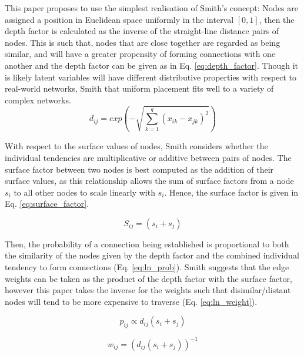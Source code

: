 \documentclass[
	a4paper, %
	10pt, %
	unnumberedsections, %
	twoside, %
]{LTJournalArticle}
\begin{document}
This paper proposes to use the simplest realisation of Smith's concept: Nodes are assigned a position in Euclidean space uniformly in the interval \([0, 1]\), then the depth factor is calculated as the inverse of the straight-line distance pairs of nodes. This is such that, nodes that are close together are regarded as being similar, and will have a greater propensity of forming connections with one another and the depth factor can be given as in Eq. \ref{eq:depth_factor}. Though it is likely latent variables will have different distributive properties with respect to real-world networks, Smith \cite{smith:21} that uniform placement fits well to a variety of complex networks. \\

\begin{equation}
	d_{ij} = exp(-\sqrt{\sum_{k=1}^{q}(x_{ik} - x_{jk})^{2}})
	\label{eq:depth_factor}
\end{equation}

With respect to the surface values of nodes, Smith considers whether the individual tendencies are multiplicative or additive between pairs of nodes. The surface factor between two nodes is best computed as the addition of their surface values, as this relationship allows the sum of surface factors from a node \(s_{i}\) to all other nodes to scale linearly with \(s_{i}\). Hence, the surface factor is given in Eq. \ref{eq:surface_factor}.

\begin{equation}
	S_{ij} = (s_{i} + s_{j}) 
	\label{eq:surface_factor}
\end{equation}

Then, the probability of a connection being established is proportional to both the similarity of the nodes given by the depth factor and the combined individual tendency to form connections (Eq. \ref{eq:ln_prob}). Smith suggests that the edge weights can be taken as the product of the depth factor with the surface factor, however this paper takes the inverse for the weights such that disimilar/distant nodes will tend to be more expensive to traverse (Eq. \ref{eq:ln_weight}). 

\begin{equation}
	p_{ij} \propto d_{ij}(s_{i} + s_{j})
	\label{eq:ln_prob}
\end{equation}

\begin{equation}
	w_{ij} = (d_{ij}(s_{i} + s_{j}))^{-1}
	\label{eq:ln_weight}
\end{equation}
\end{document}
